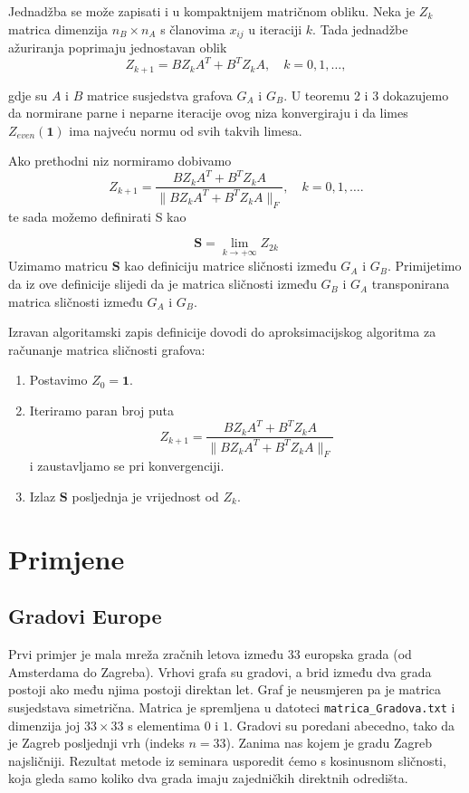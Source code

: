 \documentclass[12pt, letterpaper]{article}
\numberwithin{figure}{section}
\begin{document}
Jednadžba se može zapisati i u kompaktnijem matričnom obliku. Neka je $Z_k$ matrica dimenzija $n_B \times n_A$ s članovima $x_{ij}$ u iteraciji $k$. Tada jednadžbe ažuriranja poprimaju jednostavan oblik
\begin{equation}
Z_{k+1} = B Z_k A^T + B^T Z_k A, \quad k = 0, 1, \dots,
\end{equation}

gdje su $A$ i $B$ matrice susjedstva grafova $G_A$ i $G_B$. U teoremu 2 i 3 dokazujemo da normirane parne i neparne iteracije ovog niza konvergiraju i da limes $Z_{even}(\mathbf{1})$ ima najveću normu od svih takvih limesa.

Ako prethodni niz normiramo dobivamo
\[
Z_{k+1} = \frac{B Z_k A^T + B^T Z_k A}{\|B Z_k A^T + B^T Z_k A\|_F}, \quad k = 0, 1, \dots.
\]
te sada možemo definirati S kao

\[
\mathbf{S} = \lim_{k \to +\infty} Z_{2k}
\]
Uzimamo matricu $\mathbf{S}$ kao definiciju matrice sličnosti između $G_A$ i $G_B$. Primijetimo da iz ove definicije slijedi da je matrica sličnosti između $G_B$ i $G_A$ transponirana matrica sličnosti između $G_A$ i $G_B$.

Izravan algoritamski zapis definicije dovodi do aproksimacijskog algoritma za računanje matrica sličnosti grafova:
\begin{enumerate}
    \item Postavimo $Z_0 = \mathbf{1}$.
    \item Iteriramo paran broj puta
    \[
    Z_{k+1} = \frac{B Z_k A^T + B^T Z_k A}{\|B Z_k A^T + B^T Z_k A\|_F}
    \]
    i zaustavljamo se pri konvergenciji.
    \item Izlaz $\mathbf{S}$ posljednja je vrijednost od $Z_k$.
\end{enumerate}
\section{Primjene}
\subsection{Gradovi Europe}

Prvi primjer je mala mreža zračnih letova između $33$ europska grada (od Amsterdama do Zagreba). Vrhovi grafa su gradovi, a brid između dva grada postoji ako među njima postoji direktan let. Graf je neusmjeren pa je matrica susjedstava simetrična. Matrica je spremljena u datoteci \texttt{matrica\_Gradova.txt} i dimenzija joj  $33\times 33$ s elementima $0$ i $1$. Gradovi su poredani abecedno, tako da je Zagreb posljednji vrh (indeks $n=33$). Zanima nas kojem je gradu Zagreb najsličniji. Rezultat metode iz seminara usporedit ćemo s kosinusnom sličnosti, koja gleda samo koliko dva grada imaju zajedničkih direktnih odredišta.
\end{document}
